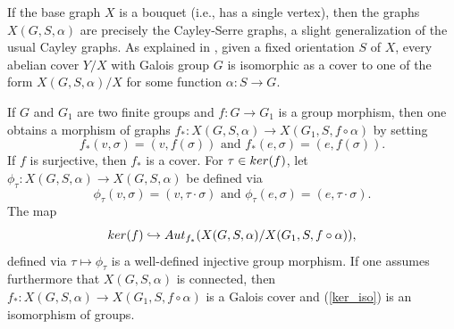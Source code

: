 \documentclass[11pt]{amsart}
\numberwithin{equation}{section}
\theoremstyle{remark}
\begin{document}
If the base graph $X$ is a bouquet (i.e., has a single vertex), then the graphs $X(G,S,\alpha)$ are precisely the Cayley-Serre graphs, a slight generalization of the usual Cayley graphs.  As explained in \cite[Section 3]{Sage/Vallieres:2022}, given a fixed orientation $S$ of $X$, every abelian cover $Y/X$ with Galois group $G$ is isomorphic as a cover to one of the form $X(G,S,\alpha)/X$ for some function $\alpha:S \rightarrow G$.  

If $G$ and $G_{1}$ are two finite groups and $f:G \rightarrow G_{1}$ is a group morphism, then one obtains a morphism of graphs $f_{*}:X(G,S,\alpha) \rightarrow X(G_{1},S,f \circ \alpha)$ by setting
$$f_{*}(v,\sigma) = (v,f(\sigma)) \text{ and } f_{*}(e,\sigma) = (e,f(\sigma)). $$
If $f$ is surjective, then $f_{*}$ is a cover.  For $\tau \in {\rm ker}(f)$, let $\phi_{\tau}:X(G,S,\alpha) \longrightarrow X(G,S,\alpha)$ be defined via
$$\phi_{\tau}(v,\sigma) = (v, \tau \cdot \sigma) \text{ and } \phi_{\tau}(e,\sigma) = (e,\tau \cdot \sigma). $$
The map 
\begin{equation} \label{ker_iso}
{\rm ker}(f) \hookrightarrow {\rm Aut}_{f_{*}}(X(G,S,\alpha)/X(G_{1},S,f \circ \alpha)),
\end{equation}
defined via $\tau \mapsto \phi_{\tau}$ is a well-defined injective group morphism.  If one assumes furthermore that $X(G,S,\alpha)$ is connected, then $f_{*}:X(G,S,\alpha) \rightarrow X(G_{1},S,f \circ \alpha)$ is a Galois cover and (\ref{ker_iso}) is an isomorphism of groups.
\end{document}

